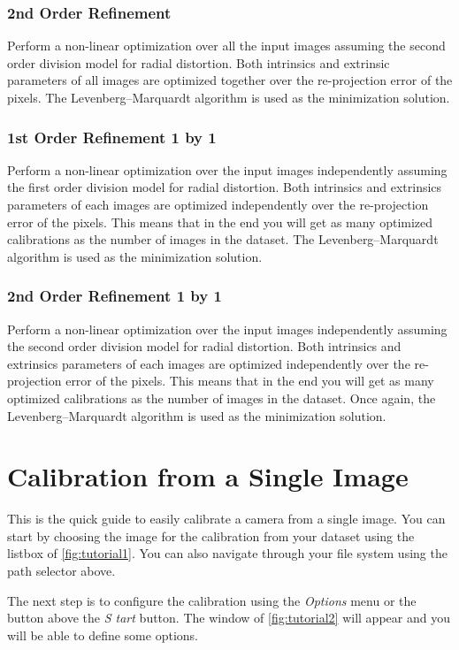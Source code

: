 \documentclass[article,11pt]{memoir}
\begin{document}
\subsection{2nd Order Refinement}
Perform a non-linear optimization over all the input images assuming the second order division model for radial distortion. Both intrinsics and extrinsic parameters of all images are optimized together over the re-projection error of the pixels. The Levenberg–Marquardt algorithm is used as the minimization solution.
\subsection{1st Order Refinement 1 by 1}
Perform a non-linear optimization over the input images independently assuming the first order division model for radial distortion. Both intrinsics and extrinsics parameters of each images are optimized independently over the re-projection error of the pixels. This means that in the end you will get as many optimized calibrations as the number of images in the dataset. The Levenberg–Marquardt algorithm is used as the minimization solution.
\subsection{2nd Order Refinement 1 by 1}
Perform a non-linear optimization over the input images independently assuming the second order division model for radial distortion. Both intrinsics and extrinsics parameters of each images are optimized independently over the re-projection error of the pixels. This means that in the end you will get as many optimized calibrations as the number of images in the dataset. Once again, the Levenberg–Marquardt algorithm is used as the minimization solution.
 

\chapter{Calibration from a Single Image}
This is the quick guide to easily calibrate a camera from a single image. You can start by choosing the image for the calibration from your dataset using the listbox of \figurename \ref{fig:tutorial1}. You can also navigate through your file system using the path selector above.


The next step is to configure the calibration using the \textit{Options} menu or the button above the \textit{S tart} button. The window of \figurename \ref{fig:tutorial2} will appear and you will be able to define some options.
\end{document}

